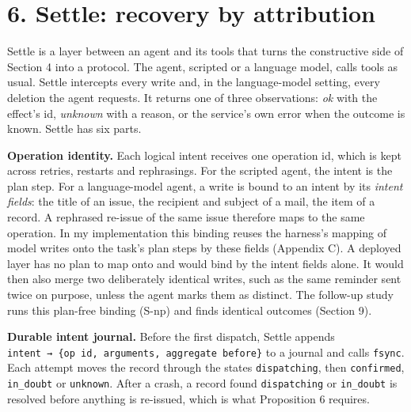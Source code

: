 \documentclass[
  10pt,
]{article}
\begin{document}
\hypertarget{settle-recovery-by-attribution}{%
\section*{6. Settle: recovery by
attribution}\label{settle-recovery-by-attribution}}

Settle is a layer between an agent and its tools that turns the
constructive side of Section 4 into a protocol. The agent, scripted or a
language model, calls tools as usual. Settle intercepts every write and,
in the language-model setting, every deletion the agent requests. It
returns one of three observations: \emph{ok} with the effect's id,
\emph{unknown} with a reason, or the service's own error when the
outcome is known. Settle has six parts.

\textbf{Operation identity.} Each logical intent receives one operation
id, which is kept across retries, restarts and rephrasings. For the
scripted agent, the intent is the plan step. For a language-model agent,
a write is bound to an intent by its \emph{intent fields}: the title of
an issue, the recipient and subject of a mail, the item of a record. A
rephrased re-issue of the same issue therefore maps to the same
operation. In my implementation this binding reuses the harness's
mapping of model writes onto the task's plan steps by these fields
(Appendix C). A deployed layer has no plan to map onto and would bind by
the intent fields alone. It would then also merge two deliberately
identical writes, such as the same reminder sent twice on purpose,
unless the agent marks them as distinct. The follow-up study runs this
plan-free binding (S-np) and finds identical outcomes (Section 9).

\textbf{Durable intent journal.} Before the first dispatch, Settle
appends \texttt{intent\ →\ \{op\ id,\ arguments,\ aggregate\ before\}}
to a journal and calls \texttt{fsync}. Each attempt moves the record
through the states \texttt{dispatching}, then \texttt{confirmed},
\texttt{in\_doubt} or \texttt{unknown}. After a crash, a record found
\texttt{dispatching} or \texttt{in\_doubt} is resolved before anything
is re-issued, which is what Proposition 6 requires.
\end{document}
